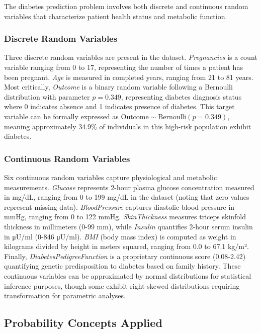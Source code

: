 \documentclass[12pt]{article}
\begin{document}
The diabetes prediction problem involves both discrete and continuous random variables that characterize patient health status and metabolic function.

\subsubsection{Discrete Random Variables}

Three discrete random variables are present in the dataset. \textit{Pregnancies} is a count variable ranging from 0 to 17, representing the number of times a patient has been pregnant. \textit{Age} is measured in completed years, ranging from 21 to 81 years. Most critically, \textit{Outcome} is a binary random variable following a Bernoulli distribution with parameter $p = 0.349$, representing diabetes diagnosis status where 0 indicates absence and 1 indicates presence of diabetes. This target variable can be formally expressed as $\text{Outcome} \sim \text{Bernoulli}(p=0.349)$, meaning approximately 34.9\% of individuals in this high-risk population exhibit diabetes.

\subsubsection{Continuous Random Variables}

Six continuous random variables capture physiological and metabolic measurements. \textit{Glucose} represents 2-hour plasma glucose concentration measured in mg/dL, ranging from 0 to 199 mg/dL in the dataset (noting that zero values represent missing data). \textit{BloodPressure} captures diastolic blood pressure in mmHg, ranging from 0 to 122 mmHg. \textit{SkinThickness} measures triceps skinfold thickness in millimeters (0-99 mm), while \textit{Insulin} quantifies 2-hour serum insulin in μU/ml (0-846 μU/ml). \textit{BMI} (body mass index) is computed as weight in kilograms divided by height in meters squared, ranging from 0.0 to 67.1 kg/m². Finally, \textit{DiabetesPedigreeFunction} is a proprietary continuous score (0.08-2.42) quantifying genetic predisposition to diabetes based on family history. These continuous variables can be approximated by normal distributions for statistical inference purposes, though some exhibit right-skewed distributions requiring transformation for parametric analyses.

\subsection{Probability Concepts Applied}
\end{document}
